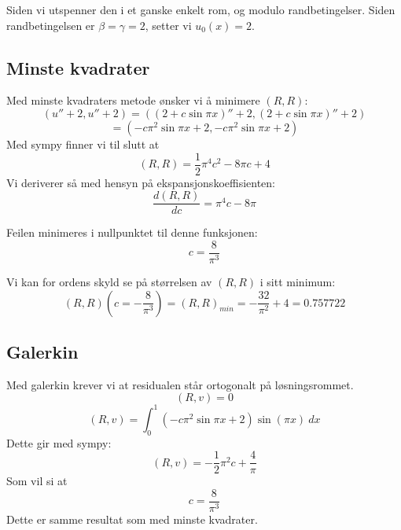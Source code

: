 \documentclass[a4paper, 10pt]{article}
\begin{document}
Siden vi utspenner den i et ganske enkelt rom, og modulo randbetingelser.
Siden randbetingelsen er $\beta = \gamma = 2$, setter vi $u_0(x) = 2$.

\subsection{Minste kvadrater}
Med minste kvadraters metode ønsker vi å minimere $(R, R)$:
\begin{equation}
	(u''+2, u'' +2) = ((2+c\sin{\pi x})''+2, (2+c\sin{\pi x})''+2)
\end{equation}
\begin{equation}
	= (-c\pi^2\sin{\pi x}+2, -c\pi^2\sin{\pi x}+2)
\end{equation}
Med sympy finner vi til slutt at 
\begin{equation}
	(R, R) = \frac{1}{2} \pi^{4} c^{2} - 8 \pi c + 4
\end{equation}
Vi deriverer så med hensyn på ekspansjonskoeffisienten:
\begin{equation}
	\frac{d(R, R)}{dc} = \pi^4 c - 8\pi
\end{equation}

Feilen minimeres i nullpunktet til denne funksjonen:
\begin{equation}
	c = \frac{8}{\pi^3}
\end{equation}

Vi kan for ordens skyld se på størrelsen av $(R, R)$ i sitt minimum:
\begin{equation}
	(R, R)(c=-\frac{8}{\pi^3}) = (R,R)_{min} = - \frac{32}{\pi^{2}} + 4 = 0.757722
\end{equation}

\subsection{Galerkin}
Med galerkin krever vi at residualen står ortogonalt på løsningsrommet.
\begin{equation}
	(R, v) = 0
\end{equation}
\begin{equation}
	(R, v) = \int_0^1 (-c\pi^2\sin{\pi x}+2)\sin(\pi x) \ dx
\end{equation}
Dette gir med sympy:
\begin{equation}
	(R, v) = - \frac{1}{2} \pi^{2} c + \frac{4}{\pi}
\end{equation}
Som vil si at 
\begin{equation}
	c = \frac{8}{\pi^{3}}
\end{equation}
Dette er samme resultat som med minste kvadrater. 
\end{document}
